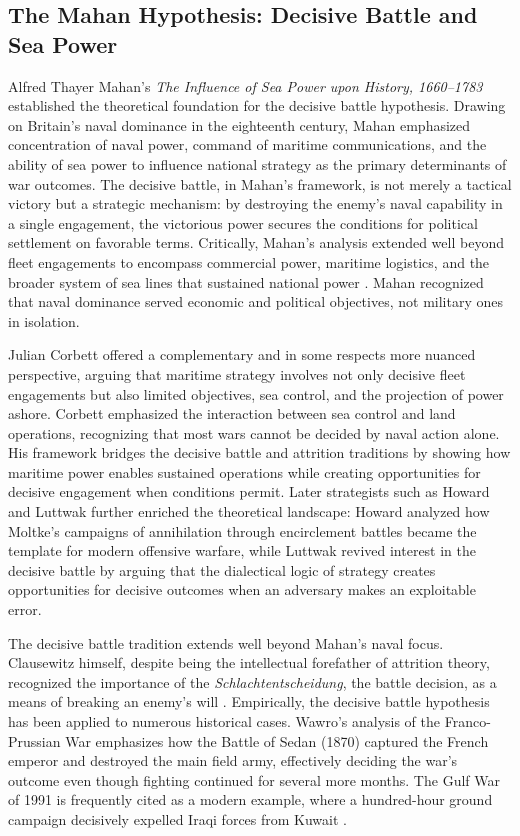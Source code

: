 \subsection{The Mahan Hypothesis: Decisive Battle and Sea Power}

Alfred Thayer Mahan's \textit{The Influence of Sea Power upon History, 1660--1783} \citep{mahan1890} established the theoretical foundation for the decisive battle hypothesis. Drawing on Britain's naval dominance in the eighteenth century, Mahan emphasized concentration of naval power, command of maritime communications, and the ability of sea power to influence national strategy as the primary determinants of war outcomes. The decisive battle, in Mahan's framework, is not merely a tactical victory but a strategic mechanism: by destroying the enemy's naval capability in a single engagement, the victorious power secures the conditions for political settlement on favorable terms. Critically, Mahan's analysis extended well beyond fleet engagements to encompass commercial power, maritime logistics, and the broader system of sea lines that sustained national power \citep{mahan1890}. Mahan recognized that naval dominance served economic and political objectives, not military ones in isolation.

Julian Corbett \citep{corbett1911} offered a complementary and in some respects more nuanced perspective, arguing that maritime strategy involves not only decisive fleet engagements but also limited objectives, sea control, and the projection of power ashore. Corbett emphasized the interaction between sea control and land operations, recognizing that most wars cannot be decided by naval action alone. His framework bridges the decisive battle and attrition traditions by showing how maritime power enables sustained operations while creating opportunities for decisive engagement when conditions permit. Later strategists such as Howard \citep{howard1979} and Luttwak \citep{luttwak1976} further enriched the theoretical landscape: Howard analyzed how Moltke's campaigns of annihilation through encirclement battles became the template for modern offensive warfare, while Luttwak revived interest in the decisive battle by arguing that the dialectical logic of strategy creates opportunities for decisive outcomes when an adversary makes an exploitable error.

The decisive battle tradition extends well beyond Mahan's naval focus. Clausewitz himself, despite being the intellectual forefather of attrition theory, recognized the importance of the \textit{Schlachtentscheidung}, the battle decision, as a means of breaking an enemy's will \citep{clausewitz1832}. Empirically, the decisive battle hypothesis has been applied to numerous historical cases. Wawro's analysis of the Franco-Prussian War \citep{wawro2003} emphasizes how the Battle of Sedan (1870) captured the French emperor and destroyed the main field army, effectively deciding the war's outcome even though fighting continued for several more months. The Gulf War of 1991 is frequently cited as a modern example, where a hundred-hour ground campaign decisively expelled Iraqi forces from Kuwait \citep{friedman1998}.

